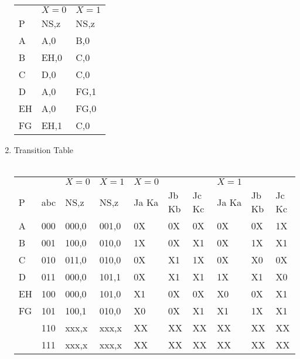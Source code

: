 \documentclass[12pt]{article}
\begin{document}
\begin{enumerate}
    \begin{tabular}{ >{\centering}p{} p{} p{}}

          & $X=0$ & $X=1$ \\ 
        P  & NS,z & NS,z  \\ \hline

        A  & A,0  & B,0  \\
        B  & EH,0 & C,0  \\
        C  & D,0  & C,0  \\
        D  & A,0  & FG,1 \\
        EH & A,0  & FG,0 \\
        FG & EH,1 & C,0  \\

    \end{tabular}

    \pagebreak

    \item Transition Table \\ \\

    \begin{tabular}{ l l l l | l l l | l l l}

         &  & $X=0$ & $X=1$ & $X=0$ & & & $X=1$ \\ 
        P & abc  & NS,z & NS,z & Ja Ka & Jb Kb & Jc Kc & Ja Ka & Jb Kb & Jc Kc \\ \hline

        A  & 000 & 000,0 & 001,0 & 0X & 0X & 0X & 0X & 0X & 1X \\

        B  & 001 & 100,0 & 010,0 & 1X & 0X & X1 & 0X & 1X & X1 \\

        C  & 010 & 011,0 & 010,0 & 0X & X1 & 1X & 0X & X0 & 0X \\

        D  & 011 & 000,0 & 101,1 & 0X & X1 & X1 & 1X & X1 & X0 \\

        EH & 100 & 000,0 & 101,0 & X1 & 0X & 0X & X0 & 0X & X1 \\

        FG & 101 & 100,1 & 010,0 & X0 & 0X & X1 & X1 & 1X & X1 \\

           & 110 & xxx,x & xxx,x & XX & XX & XX & XX & XX & XX \\
           & 111 & xxx,x & xxx,x & XX & XX & XX & XX & XX & XX \\


\end{tabular}
\end{enumerate}
\end{document}

